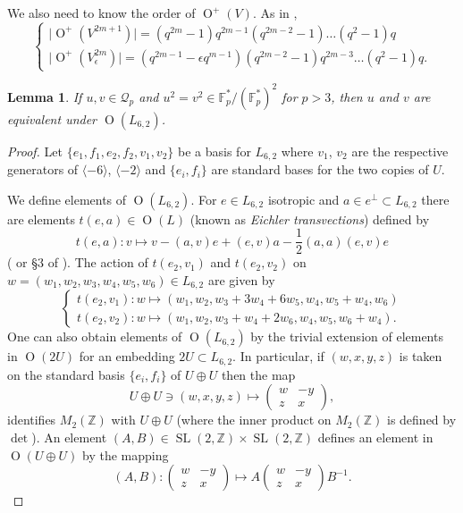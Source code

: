 \documentclass[11pt]{amsart}
\newtheorem{lem}[thm]{Lemma}
\newcommand{\ZZ}{\mathbb{Z}}
\newcommand{\FF}{\mathbb{F}}
\newcommand{\qc}{\mathcal{Q}}
\newcommand{\la}{\langle}
\newcommand{\ra}{\rangle}
\newcommand{\opn}{\operatorname}
\newcommand{\op}{\oplus}
\begin{document}
We also need to know the order of $\opn{O}^+(V)$. 
As in \cite{Dieudonne},
\begin{equation*}
\begin{cases}
\vert \opn{O}^+(V^{2m+1})\vert = (q^{2m} -1) q^{2m-1} (q^{2m-2} - 1) \ldots (q^2 - 1) q \\
\vert \opn{O}^+(V_{\epsilon}^{2m}) \vert = (q^{2m-1} - \epsilon q^{m-1})(q^{2m-2}  - 1) q^{2m-3} \ldots (q^2 - 1 ) q.
\end{cases}
\end{equation*}
\begin{lem}\label{translemma} 
If $u, v \in \qc_p$ and $u^2 = v^2 \in \FF_p^*/(\FF_p^*)^2$ for $p>3$, then $u$ and $v$ are equivalent under $\opn{O}(L_{6,2})$.
\end{lem}
\begin{proof}
Let $\{e_1, f_1, e_2, f_2, v_1, v_2 \}$ be a basis for $L_{6,2}$ where $v_1$, $v_2$ are the respective generators of $\la -6 \ra$, $\la -2 \ra$  and $\{e_i, f_i \}$ are standard bases for the two copies of $U$. 

We define elements of $\opn{O}(L_{6,2})$.
For $e \in L_{6,2}$ isotropic and $a \in e^{\perp} \subset L_{6,2}$ there are elements $t(e,a) \in \opn{O}(L)$ (known as \emph{Eichler transvections}) defined by
\begin{equation*}
t(e, a) : v \mapsto v - (a,v)e + (e,v)a - \frac{1}{2}(a,a)(e,v)e
\end{equation*}
(\cite{eichler} or \S3 of \cite{abelianisation}).
The action of $t(e_2, v_1)$ and $t(e_2, v_2)$ on $w = (w_1, w_2, w_3, w_4, w_5, w_6) \in L_{6,2}$ are given by  
\begin{equation*}
\begin{cases}
t(e_2, v_1): w \mapsto (w_1, w_2, w_3 + 3w_4 + 6w_5, w_4, w_5 + w_4, w_6  ) \\
t(e_2, v_2): w \mapsto (w_1, w_2, w_3 + w_4 + 2w_6, w_4, w_5, w_6 + w_4).
\end{cases}
\end{equation*}
One can also obtain elements of $\opn{O}(L_{6,2})$ by the trivial extension of elements in $\opn{O}(2U)$ for an embedding $2U \subset L_{6,2}$.
In particular, if $(w,x,y,z)$ is taken on the standard basis $\{e_i, f_i\}$ of $U \op U$ then the map
\begin{equation}\label{sliso}
U \op U \ni (w,x,y,z) \mapsto 
\begin{pmatrix}
 w & -y \\ 
z & x 
\end{pmatrix},
\end{equation}
identifies $M_2(\ZZ)$ with $U \op U$ (where the inner product on $M_2(\ZZ)$ is defined by $\opn{det}$). 
An element $(A, B) \in \opn{SL}(2, \ZZ) \times \opn{SL}(2, \ZZ)$ defines an element in $\opn{O}(U \op U)$ by the mapping
\begin{equation*}
(A, B) : 
\begin{pmatrix}
w & -y \\ 
z & x 
\end{pmatrix} 
\mapsto 
A 
\begin{pmatrix} 
w & -y \\ 
z & x 
\end{pmatrix}
B^{-1}.
\end{equation*}


\end{proof}
\end{document}
